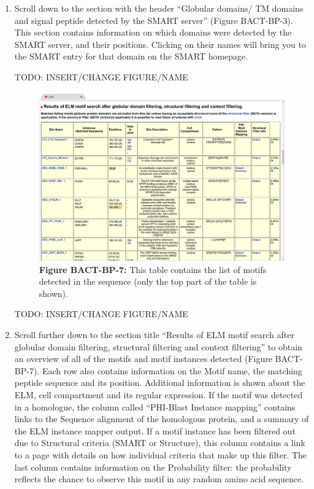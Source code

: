 \begin{enumerate}
\item Scroll down to the section with the header ``Globular domains/ TM domains
	and signal peptide detected by the SMART server'' (Figure BACT-BP-3).
	This section contains information on which domains were detected by the
	SMART server, and their positions. Clicking on their names will bring
	you to the SMART entry for that domain on the SMART homepage.

TODO: INSERT/CHANGE FIGURE/NAME

\begin{figure}[h!]
	\centering
	\includegraphics[width=\textwidth]{Figures/predicting_p53/elm_results_motifs.png}
	\caption{
	\textbf{Figure BACT-BP-7:} This table contains the list of motifs
	detected in the sequence (only the top part of the table is shown).
	}
	\label{predicting_p53_elm_results_motifs}
\end{figure}

TODO: INSERT/CHANGE FIGURE/NAME

\item Scroll further down to the section title ``Results of ELM motif search
	after globular domain filtering, structural filtering and context
	filtering'' to obtain an overview of all of the motifs and motif
	instances detected (Figure BACT-BP-7). Each row also contains
	information on the Motif name, the matching peptide sequence and its
	position. Additional information is shown about the ELM, cell
	compartment and its regular expression. If the motif was detected in a
	homologue, the column called ``PHI-Blast Instance mapping'' contains
	links to the Sequence alignment of the homologous protein, and a
	summary of the ELM instance mapper output. If a motif instance has been
	filtered out due to Structural criteria (SMART or Structure), this
	column contains a link to a page with details on how individual
	criteria that make up this filter. The last column contains information
	on the Probability filter: the probability reflects the chance to
	observe this motif in any random amino acid sequence.  


\end{enumerate}
